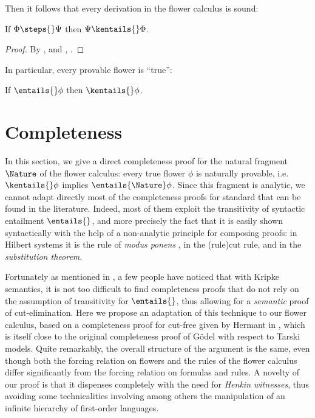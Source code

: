 Then it follows that every derivation in the flower calculus is sound:

\begin{lemma}
  If $\Phi \steps{} \Psi$ then $\Psi \kentails{}\Phi$.
\end{lemma}
\begin{proof}
  By , 
  and , .
\end{proof}

In particular, every provable flower is ``true'':

\begin{theorem}[Soundness]
  If $\entails{} \phi$ then $\kentails{}\phi$.
\end{theorem}

\section{Completeness}

In this section, we give a direct completeness proof for the natural fragment
$\Nature$ of the flower calculus: every true flower $\phi$ is naturally
provable, i.e. $\kentails{}\phi$ implies $\entails{\Nature} \phi$. Since this
fragment is analytic, we cannot adapt directly most of the completeness proofs
for standard  that can be found in the literature. Indeed, most of
them exploit the transitivity of syntactic entailment $\entails{}$, and more
precisely the fact that it is easily shown syntactically with the help of a
non-analytic principle for composing proofs: in Hilbert systems it is the rule
of \emph{modus ponens} , in  the \kl(rule){cut} rule, and
in  the \emph{substitution theorem}.

Fortunately as mentioned in , a few people have noticed that
with Kripke semantics, it is not too difficult to find completeness proofs that
do not rely on the assumption of transitivity for $\entails{}$, thus allowing
for a \emph{semantic} proof of cut-elimination. Here we propose an adaptation of
this technique to our flower calculus, based on a completeness proof for
cut-free  given by Hermant in
, which is itself close to the original
completeness proof of Gödel with respect to  Tarski models. Quite
remarkably, the overall structure of the argument is the same, even though both
the forcing relation on flowers and the rules of the flower calculus differ
significantly from the forcing relation on formulas and  rules.
A novelty of our proof is that it dispenses completely with the need for
\emph{Henkin witnesses}, thus avoiding some technicalities involving among
others the manipulation of an infinite hierarchy of first-order languages.

